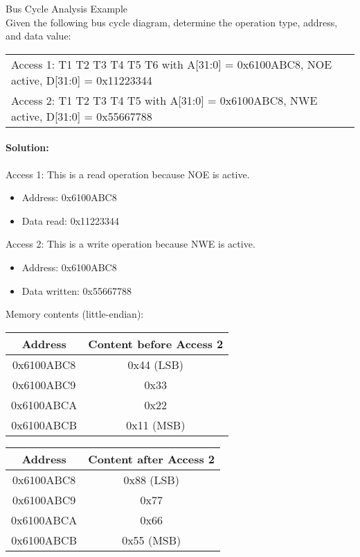 \begin{example2}{Bus Cycle Analysis Example}\\
Given the following bus cycle diagram, determine the operation type, address, and data value:

\begin{center}
\begin{tabular}{l}
Access 1: T1 T2 T3 T4 T5 T6 with A[31:0] = 0x6100ABC8, NOE active, D[31:0] = 0x11223344 \\
Access 2: T1 T2 T3 T4 T5 with A[31:0] = 0x6100ABC8, NWE active, D[31:0] = 0x55667788
\end{tabular}
\end{center}

\tcblower
\paragraph{Solution:}
Access 1: This is a read operation because NOE is active.
\begin{itemize}
    \item Address: 0x6100ABC8
    \item Data read: 0x11223344
\end{itemize}

Access 2: This is a write operation because NWE is active.
\begin{itemize}
    \item Address: 0x6100ABC8
    \item Data written: 0x55667788
\end{itemize}

Memory contents (little-endian):
\begin{center}
\begin{tabular}{|c|c|}
\hline
\textbf{Address} & \textbf{Content before Access 2} \\
\hline
0x6100ABC8 & 0x44 (LSB) \\
0x6100ABC9 & 0x33 \\
0x6100ABCA & 0x22 \\
0x6100ABCB & 0x11 (MSB) \\
\hline
\end{tabular}
\quad
\begin{tabular}{|c|c|}
\hline
\textbf{Address} & \textbf{Content after Access 2} \\
\hline
0x6100ABC8 & 0x88 (LSB) \\
0x6100ABC9 & 0x77 \\
0x6100ABCA & 0x66 \\
0x6100ABCB & 0x55 (MSB) \\
\hline
\end{tabular}
\end{center}
\end{example2}

